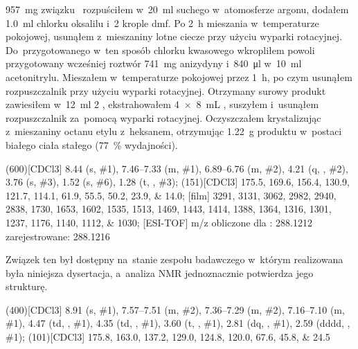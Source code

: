 \SI{957}{\mg} związku~ rozpuściłem w~\SI{20}{\ml}
  suchego  w~atomosferze argonu, dodałem \SI{1.0}{\ml} chlorku oksalilu
  i~\num{2} krople \gls{dmf}.
Po \SI{2}{\hour} mieszania w~temperaturze pokojowej, usunąłem z~mieszaniny lotne ciecze
  przy użyciu wyparki rotacyjnej.
Do~przygotowanego w~ten sposób chlorku kwasowego wkropliłem powoli przygotowany wcześniej roztwór
  \SI{741}{\mg} anizydyny i~\SI{840}{\ul}  w~\SI{10}{\ml} acetonitrylu.
Mieszałem w~temperaturze pokojowej przez \SI{1}{\hour}, po czym usunąłem rozpuszczalnik
  przy użyciu wyparki rotacyjnej.
Otrzymany surowy produkt zawiesiłem w~\SI{12}{\ml} \SI{2}{\Molar} ,
  ekstrahowałem \SI[product-units = single]{4 x 8}{\mL} , suszyłem 
  i~usunąłem rozpuszczalnik za~pomocą wyparki rotacyjnej.
Oczyszczałem krystalizując z~mieszaniny octanu etylu z~heksanem, otrzymując \SI{1.22}{\gram}
  produktu w~postaci białego ciała stałego (\SI{77}{\percent} wydajności).

\begin{fullexp}
  \NMR(600)[CDCl3] \num{8.44} (s, \#{1}), \numrange{7.46}{7.33} (m, \#{1}), \numrange{6.89}{6.76} (m, \#{2}), \num{4.21} (q, , \#{2}), \num{3.76} (s, \#{3}), \num{1.52} (s, \#{6}), \num{1.28} (t, , \#{3});
  (151)[CDCl3] \numlist{175.5; 169.6; 156.4; 130.9; 121.7; 114.1; 61.9; 55.5; 50.2; 23.9; 14.0};
  [film] \numlist{3291; 3131; 3062; 2982; 2940; 2838; 1730; 1653; 1602; 1535; 1513; 1469; 1443; 1414; 1388; 1364; 1316; 1301; 1237; 1176; 1140; 1112; 1030};
  [ESI-TOF] m/z obliczone dla : \num{288.1212} zarejestrowane: \num{288.1216}
\end{fullexp}
  
Związek ten był dostępny na~stanie zespołu badawczego w~którym realizowana była niniejsza
  dysertacja, a~analiza NMR jednoznacznie potwierdza jego strukturę.

\begin{fullexp}
  \NMR(400)[CDCl3] \num{8.91} (s, \#{1}), \numrange{7.57}{7.51} (m, \#{2}), \numrange{7.36}{7.29} (m, \#{2}), \numrange{7.16}{7.10} (m, \#{1}), \num{4.47} (td, , \#{1}), \num{4.35} (td, , \#{1}), \num{3.60} (t, , \#{1}), \num{2.81} (dq, , \#{1}), \num{2.59} (dddd, , \#{1}); 
  (101)[CDCl3] \numlist{175.8; 163.0; 137.2; 129.0; 124.8; 120.0; 67.6; 45.8; 24.5}
\end{fullexp}


